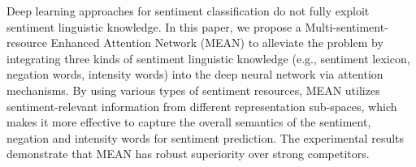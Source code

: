 Deep learning approaches for sentiment classification do not fully exploit sentiment linguistic knowledge. In this paper, we propose a Multi-sentiment-resource Enhanced Attention Network (MEAN) to alleviate the problem by integrating three kinds of sentiment linguistic knowledge (e.g., sentiment lexicon, negation words, intensity words) into the deep neural network via attention mechanisms. By using various types of sentiment resources, MEAN utilizes sentiment-relevant information from different representation sub-spaces, which makes it more effective to capture the overall semantics of the sentiment, negation and intensity words for sentiment prediction. The experimental results demonstrate that MEAN has robust superiority over strong competitors.
